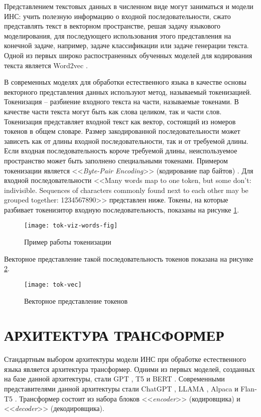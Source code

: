 Представлением текстовых данных в численном виде могут заниматься и модели ИНС: учить полезную информацию о входной последовательности, сжато представлять текст в векторном пространстве, решая задачу языкового моделирования, для последующего использования этого представления на конечной задаче, например, задаче классификации или задаче генерации текста. Одной из первых широко распостраненных обученных моделей для кодирования текста является Word2vec \cite{word2vec-paper}.

В современных моделях для обработки естественного языка в качестве основы векторного представления данных используют метод, называемый токенизацией. Токенизация -- разбиение входного текста на части, называемые токенами. В качестве части текста могут быть как слова целиком, так и части слов. Токенизация представляет входной текст как вектор, состоящий из номеров токенов в общем словаре. Размер закодированной последовательности может зависеть как от длины входной последовательности, так и от требуемой длины. Если входная последовательность короче требуемой длины, неиспользуемое пространство может быть заполнено специальными токенами. Примером токенизации является <<\textit{Byte-Pair Encoding}>> (кодирование пар байтов) \cite{bpe-paper}. Для входной последовательности <<Many words map to one token, but some don't: indivisible. Sequences of characters commonly found next to each other may be grouped together: 1234567890>> представлен ниже. Токены, на которые разбивает токенизитор входную последовательность, показаны на рисунке \ref{fig:tok-viz-words-fig}.
\begin{figure}[H]
    \centering
    \texttt{[image: tok-viz-words-fig]}
    \caption{Пример работы токенизации}
    \label{fig:tok-viz-words-fig}
\end{figure}

Векторное представление такой последовательность токенов показана на рисунке \ref{fig:tok-vec}.
\begin{figure}[H]
    \centering
    \texttt{[image: tok-vec]}
    \caption{Векторное представление токенов}
    \label{fig:tok-vec}
\end{figure}

\section{АРХИТЕКТУРА ТРАНСФОРМЕР}
Стандартным выбором архитектуры модели ИНС при обработке естественного языка является архитектура трансформер. Одними из первых моделей, созданных на базе данной архитектуры, стали GPT \cite{gpt-paper}, T5 \cite{t5-paper} и BERT \cite{bert-paper}. Современными представителями данной архитектуры стали ChatGPT \cite{chatgpt-docs}, LLAMA \cite{llama-paper}, Alpaca \cite{alpaca-docs} и Flan-T5 \cite{flan-paper}. Трансформер состоит из набора блоков <<\textit{encoder}>> (кодировщика) и <<\textit{decoder}>> (декодировщика).

